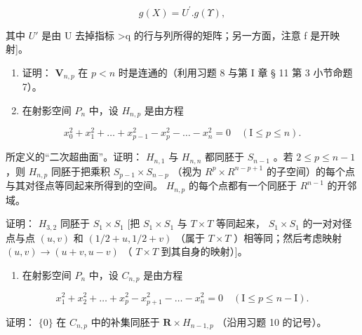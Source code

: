 \[
g (X) = U ^ {\prime}. g (\Upsilon),
\]

其中 \(U'\) 是由 U 去掉指标 \textgreater q 的行与列所得的矩阵；另一方面，注意 f 是开映射{]}。

\begin{enumerate}
\def\labelenumi{\arabic{enumi})}
\setcounter{enumi}{8}
\item
  证明： \(\mathbf{V}_{n,p}\) 在 \(p < n\) 时是连通的（利用习题 8 与第 I 章 § 11 第 3 小节命题 7）。
\item
  在射影空间 \(P_{n}\) 中，设 \(H_{n,p}\) 是由方程
\end{enumerate}

\[
x _ {0} ^ {2} + x _ {1} ^ {2} + \dots + x _ {p - 1} ^ {2} - x _ {p} ^ {2} - \dots - x _ {n} ^ {2} = 0 \quad (\mathrm{I} \leqslant p \leqslant n).
\]

所定义的“二次超曲面”。证明： \(H_{n,1}\) 与 \(H_{n,n}\) 都同胚于 \(S_{n-1}\) 。若 \(2 \leqslant p \leqslant n - 1\) ，则 \(H_{n,p}\) 同胚于把乘积 \(S_{p-1} \times S_{n-p}\) （视为 \(R^{p} \times R^{n-p+1}\) 的子空间）的每个点与其对径点等同起来所得到的空间。 \(H_{n,p}\) 的每个点都有一个同胚于 \(R^{n-1}\) 的开邻域。

证明： \(H_{3,2}\) 同胚于 \(S_{1} \times S_{1}\) {[}把 \(S_{1} \times S_{1}\) 与 \(T \times T\) 等同起来， \(S_{1} \times S_{1}\) 的一对对径点与点 \((u, v)\) 和 \((1/2 + u, 1/2 + v)\) （属于 \(T \times T\) ）相等同；然后考虑映射 \((u, v) \to (u + v, u - v)\) （ \(T \times T\) 到其自身的映射）{]}。

\begin{enumerate}
\def\labelenumi{\arabic{enumi})}
\setcounter{enumi}{10}
\tightlist
\item
  在射影空间 \(P_{n}\) 中，设 \(C_{n,p}\) 是由方程
\end{enumerate}

\[
x _ {1} ^ {2} + x _ {2} ^ {2} + \dots + x _ {p} ^ {2} - x _ {p + 1} ^ {2} - \dots - x _ {n} ^ {2} = 0 \quad (\mathrm{I} \leqslant p \leqslant n - \mathrm{I}).
\]

证明： \(\{0\}\) 在 \(C_{n,p}\) 中的补集同胚于 \(\mathbf{R} \times H_{n-1,p}\) （沿用习题 10 的记号）。

